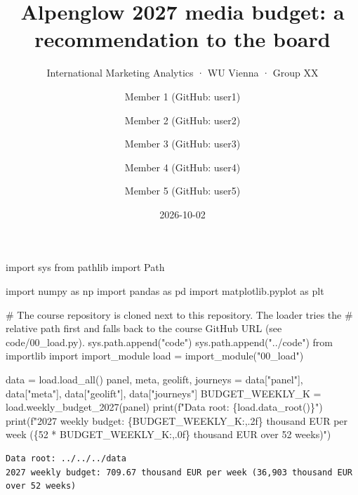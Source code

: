 \documentclass[
  letterpaper,
  DIV=11,
  numbers=noendperiod]{scrartcl}
\title{Alpenglow 2027 media budget: a recommendation to the board}
\subtitle{International Marketing Analytics · WU Vienna · Group XX}
\author{Member 1 (GitHub: user1) \and Member 2 (GitHub:
user2) \and Member 3 (GitHub: user3) \and Member 4 (GitHub:
user4) \and Member 5 (GitHub: user5)}
\date{2026-10-02}
\newenvironment{Shaded}{\begin{snugshade}}{\end{snugshade}}
\newcommand{\BuiltInTok}[1]{\textcolor[rgb]{0.00,0.23,0.31}{#1}}
\newcommand{\CommentTok}[1]{\textcolor[rgb]{0.37,0.37,0.37}{#1}}
\newcommand{\DecValTok}[1]{\textcolor[rgb]{0.68,0.00,0.00}{#1}}
\newcommand{\ImportTok}[1]{\textcolor[rgb]{0.00,0.46,0.62}{#1}}
\newcommand{\NormalTok}[1]{\textcolor[rgb]{0.00,0.23,0.31}{#1}}
\newcommand{\OperatorTok}[1]{\textcolor[rgb]{0.37,0.37,0.37}{#1}}
\newcommand{\SpecialCharTok}[1]{\textcolor[rgb]{0.37,0.37,0.37}{#1}}
\newcommand{\SpecialStringTok}[1]{\textcolor[rgb]{0.13,0.47,0.30}{#1}}
\newcommand{\StringTok}[1]{\textcolor[rgb]{0.13,0.47,0.30}{#1}}
\begin{document}
\maketitle


\label{setup}
\begin{Shaded}
\begin{Highlighting}[]
\ImportTok{import}\NormalTok{ sys}
\ImportTok{from}\NormalTok{ pathlib }\ImportTok{import}\NormalTok{ Path}

\ImportTok{import}\NormalTok{ numpy }\ImportTok{as}\NormalTok{ np}
\ImportTok{import}\NormalTok{ pandas }\ImportTok{as}\NormalTok{ pd}
\ImportTok{import}\NormalTok{ matplotlib.pyplot }\ImportTok{as}\NormalTok{ plt}

\CommentTok{\# The course repository is cloned next to this repository. The loader tries the}
\CommentTok{\# relative path first and falls back to the course GitHub URL (see code/00\_load.py).}
\NormalTok{sys.path.append(}\StringTok{"code"}\NormalTok{)}
\NormalTok{sys.path.append(}\StringTok{"../code"}\NormalTok{)}
\ImportTok{from}\NormalTok{ importlib }\ImportTok{import}\NormalTok{ import\_module}
\NormalTok{load }\OperatorTok{=}\NormalTok{ import\_module(}\StringTok{"00\_load"}\NormalTok{)}

\NormalTok{data }\OperatorTok{=}\NormalTok{ load.load\_all()}
\NormalTok{panel, meta, geolift, journeys }\OperatorTok{=}\NormalTok{ data[}\StringTok{"panel"}\NormalTok{], data[}\StringTok{"meta"}\NormalTok{], data[}\StringTok{"geolift"}\NormalTok{], data[}\StringTok{"journeys"}\NormalTok{]}
\NormalTok{BUDGET\_WEEKLY\_K }\OperatorTok{=}\NormalTok{ load.weekly\_budget\_2027(panel)}
\BuiltInTok{print}\NormalTok{(}\SpecialStringTok{f"Data root: }\SpecialCharTok{\{}\NormalTok{load}\SpecialCharTok{.}\NormalTok{data\_root()}\SpecialCharTok{\}}\SpecialStringTok{"}\NormalTok{)}
\BuiltInTok{print}\NormalTok{(}\SpecialStringTok{f"2027 weekly budget: }\SpecialCharTok{\{}\NormalTok{BUDGET\_WEEKLY\_K}\SpecialCharTok{:,.2f\}}\SpecialStringTok{ thousand EUR per week (}\SpecialCharTok{\{}\DecValTok{52} \OperatorTok{*}\NormalTok{ BUDGET\_WEEKLY\_K}\SpecialCharTok{:,.0f\}}\SpecialStringTok{ thousand EUR over 52 weeks)"}\NormalTok{)}
\end{Highlighting}
\end{Shaded}

\begin{verbatim}
Data root: ../../../data
2027 weekly budget: 709.67 thousand EUR per week (36,903 thousand EUR over 52 weeks)
\end{verbatim}
\end{document}
